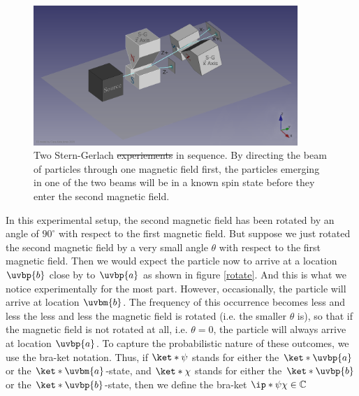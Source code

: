 \documentclass[12pt]{report}
\providecommand{\DIFadd}[1]{{\protect\color{blue}\uwave{#1}}} %
\providecommand{\DIFdel}[1]{{\protect\color{red}\sout{#1}}}                      %
\providecommand{\DIFaddFL}[1]{\DIFadd{#1}} %
\providecommand{\DIFdelFL}[1]{\DIFdel{#1}} %
\providecommand{\DIFaddbeginFL}{} %
\providecommand{\DIFaddendFL}{} %
\providecommand{\DIFdelbeginFL}{} %
\providecommand{\DIFdelendFL}{} %
\begin{document}
\begin{figure}[ht!]
\captionsetup{justification=centering}
\centering
\includegraphics[width=100mm]{Chapter01/1920px-Stern-Gerlach_Analyzer_Sequential_Series_E2v.png}
\vspace*{10px}
\DIFdelbeginFL %
\DIFdelendFL \DIFaddbeginFL \caption[Two Stern-Gerlach experiments in sequence]{\DIFaddendFL Two Stern-Gerlach \DIFdelbeginFL \DIFdelFL{experiements }\DIFdelendFL \DIFaddbeginFL \DIFaddFL{experiments }\DIFaddendFL in sequence. By directing the beam of particles through one magnetic field first, the particles emerging in one of the two beams will be in a known spin state before they enter the second magnetic field.\protect\footnotemark}
\label{knownspin}
\end{figure}
 In this experimental setup, the second magnetic field has been rotated by an angle of $90^\circ$ with respect to the first magnetic field. But suppose we just rotated the second magnetic field by a very small angle $\theta$ with respect to the first magnetic field. Then we would expect the particle now to arrive at a location  $\uvbp{b}$ close by to $\uvbp{a}$ as shown in figure \ref{rotate}. And this is what we notice experimentally for the most part. However, occasionally, the particle will arrive at location $\uvbm{b}$. The frequency of this occurrence becomes less and less the less and less the magnetic field is rotated (i.e. the smaller $\theta$ is), so that if the magnetic field is not rotated at all, i.e. $\theta=0$, the particle will always arrive at location $\uvbp{a}$. 
To capture the probabilistic nature of these outcomes, we use the bra-ket notation. Thus, if $\ket*{\psi}$ stands for either the $\ket*{\uvbp{a}}$ or the $\ket*{\uvbm{a}}$-state, and $\ket*{\chi}$ stands for either the $\ket*{\uvbp{b}}$ or the $\ket*{\uvbp{b}}$-state, then we define the bra-ket $\ip*{\psi}{\chi}\in\mathbb{C}$  %
\end{document}
